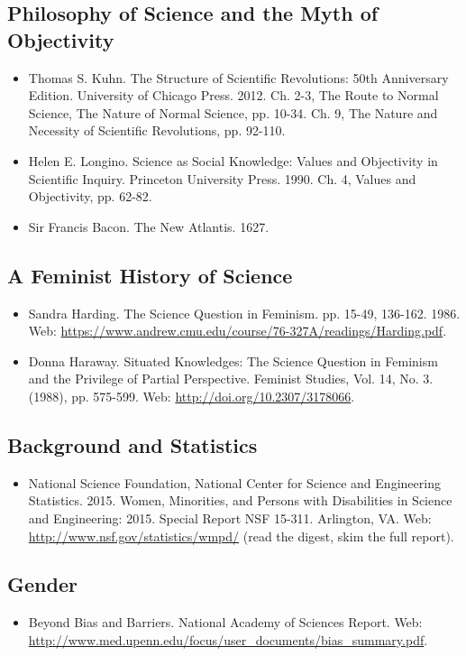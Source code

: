 \documentclass{article}
\begin{document}
\subsection{Philosophy of Science and the Myth of Objectivity}
\begin{itemize}
\item Thomas S. Kuhn. The Structure of Scientific Revolutions: 50th Anniversary Edition. University of Chicago Press. 2012. Ch. 2-3, The Route to Normal Science, The Nature of Normal Science, pp. 10-34. Ch. 9, The Nature and Necessity of Scientific Revolutions, pp. 92-110.
\item Helen E. Longino. Science as Social Knowledge: Values and Objectivity in Scientific Inquiry. Princeton University Press. 1990. Ch. 4, Values and Objectivity, pp. 62-82.
\item Sir Francis Bacon. The New Atlantis. 1627.
\end{itemize}

\subsection{A Feminist History of Science}
\begin{itemize}
\item Sandra Harding. The Science Question in Feminism. pp. 15-49, 136-162. 1986. Web: \url{https://www.andrew.cmu.edu/course/76-327A/readings/Harding.pdf}.
\item Donna Haraway. Situated Knowledges: The Science Question in Feminism and the Privilege of Partial Perspective. Feminist Studies, Vol. 14, No. 3. (1988), pp. 575-599. Web: \url{http://doi.org/10.2307/3178066}.
\end{itemize}

\subsection{Background and Statistics}
\begin{itemize}
\item National Science Foundation, National Center for Science and Engineering Statistics. 2015. Women, Minorities, and Persons with Disabilities in Science and Engineering: 2015. Special Report NSF 15-311. Arlington, VA. Web: \url{http://www.nsf.gov/statistics/wmpd/} (read the digest, skim the full report).
\end{itemize}

\subsection{Gender}
\begin{itemize}
\item Beyond Bias and Barriers. National Academy of Sciences Report. Web: \url{http://www.med.upenn.edu/focus/user_documents/bias_summary.pdf}.
\end{itemize}
\end{document}
